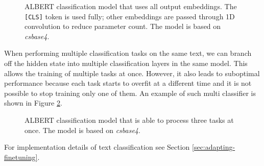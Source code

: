 \documentclass[
  printed, %
  color,   %
  table,   %
  oneside, %
  lof,     %
  lot,     %
]{fithesis3}
\begin{document}
\begin{figure}[h]
    \caption[ALBERT classification model -- use all output embeddings]{
        ALBERT classification model that uses all output embeddings. The \texttt{[CLS]} token is used fully; other embeddings are passed through 1D convolution to reduce parameter count. The model is based on \textit{csbase4}.
    }
    \label{fig:model-class-use-embed}
    \centering
\end{figure}


When performing multiple classification tasks on the same text, we can branch off the hidden state into multiple classification layers in the same model. This allows the training of multiple tasks at once.
However, it also leads to suboptimal performance because each task starts to overfit at a different time and it is not possible to stop training only one of them. An example of such multi classifier is shown in Figure \ref{fig:model-class-multi}.

\begin{figure}[hbt]
    \caption[ALBERT classification model -- multiple tasks at once]{
        ALBERT classification model that is able to process three tasks at once. The model is based on \textit{csbase4}.
    }
    \label{fig:model-class-multi}
    \centering

\end{figure}

{\parindent=0cm
For implementation details of text classification see Section \ref{sec:adapting-finetuning}.
}
\end{document}
